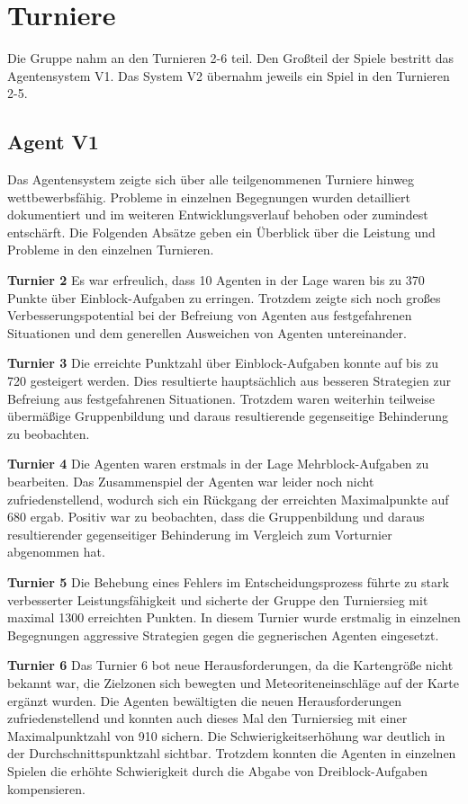 \documentclass[runningheads]{llncs}
\begin{document}
\section{Turniere}\label{Turniere}
Die Gruppe nahm an den Turnieren 2-6 teil. Den Großteil der Spiele bestritt das Agentensystem V1. Das System V2 übernahm jeweils ein Spiel in den Turnieren 2-5. 

\subsection{Agent V1}
Das Agentensystem zeigte sich über alle teilgenommenen Turniere hinweg wettbewerbsfähig. Probleme in einzelnen Begegnungen wurden detailliert dokumentiert und im weiteren Entwicklungsverlauf behoben oder zumindest entschärft. Die Folgenden Absätze geben ein Überblick über die Leistung und Probleme in den einzelnen Turnieren.

\textbf{Turnier 2}
Es war erfreulich, dass 10 Agenten in der Lage waren bis zu 370 Punkte über Einblock-Aufgaben zu erringen. Trotzdem zeigte sich noch großes Verbesserungspotential bei der Befreiung von Agenten aus festgefahrenen Situationen und dem generellen Ausweichen von Agenten untereinander.

\textbf{Turnier 3}
Die erreichte Punktzahl über Einblock-Aufgaben konnte auf bis zu 720 gesteigert werden. Dies resultierte hauptsächlich aus besseren Strategien zur Befreiung aus festgefahrenen Situationen. Trotzdem waren weiterhin teilweise übermäßige Gruppenbildung und daraus resultierende gegenseitige Behinderung zu beobachten.

\textbf{Turnier 4}
Die Agenten waren erstmals in der Lage Mehrblock-Aufgaben zu bearbeiten. Das Zusammenspiel der Agenten war leider noch nicht zufriedenstellend, wodurch sich ein Rückgang der erreichten Maximalpunkte auf 680 ergab. Positiv war zu beobachten, dass die Gruppenbildung und daraus resultierender gegenseitiger Behinderung im Vergleich zum Vorturnier abgenommen hat.

\textbf{Turnier 5}
 Die Behebung eines Fehlers im Entscheidungsprozess führte zu stark verbesserter Leistungsfähigkeit und sicherte der Gruppe den Turniersieg mit maximal 1300 erreichten Punkten. In diesem Turnier wurde erstmalig in einzelnen Begegnungen aggressive Strategien gegen die gegnerischen Agenten eingesetzt.

\textbf{Turnier 6}
Das Turnier 6 bot neue Herausforderungen, da die Kartengröße nicht bekannt war, die Zielzonen sich bewegten und Meteoriteneinschläge auf der Karte ergänzt wurden. Die Agenten bewältigten die neuen Herausforderungen zufriedenstellend und konnten auch dieses Mal den Turniersieg mit einer Maximalpunktzahl von 910 sichern. Die Schwierigkeitserhöhung war deutlich in der Durchschnittspunktzahl sichtbar. Trotzdem konnten die Agenten in einzelnen Spielen die erhöhte Schwierigkeit durch die Abgabe von Dreiblock-Aufgaben kompensieren.
\end{document}
